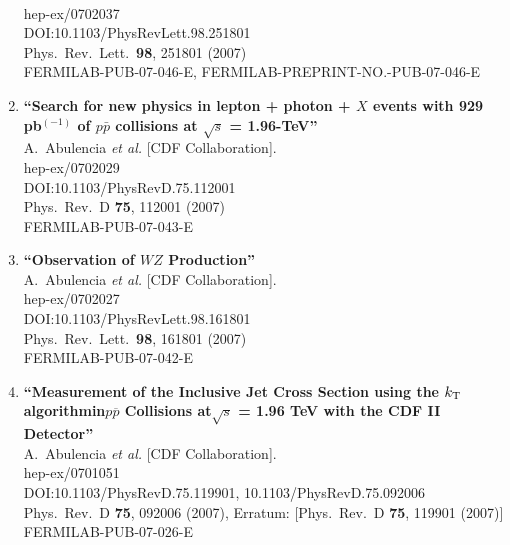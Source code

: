 \documentclass{article}
\begin{document}
\begin{enumerate}
  \\{}hep-ex/0702037
  \\{}DOI:10.1103/PhysRevLett.98.251801
  \\{}Phys.\ Rev.\ Lett.\  {\bf 98}, 251801 (2007)
  \\{}FERMILAB-PUB-07-046-E, FERMILAB-PREPRINT-NO.-PUB-07-046-E
\item%
{\bf ``Search for new physics in lepton + photon + $X$ events with 929 pb$^{(-1)}$ of $p \bar{p}$ collisions at $\sqrt{s}$ = 1.96-TeV''}
  \\{}A.~Abulencia {\it et al.} [CDF Collaboration].
  \\{}hep-ex/0702029
  \\{}DOI:10.1103/PhysRevD.75.112001
  \\{}Phys.\ Rev.\ D {\bf 75}, 112001 (2007)
  \\{}FERMILAB-PUB-07-043-E
\item%
{\bf ``Observation of $WZ$ Production''}
  \\{}A.~Abulencia {\it et al.} [CDF Collaboration].
  \\{}hep-ex/0702027
  \\{}DOI:10.1103/PhysRevLett.98.161801
  \\{}Phys.\ Rev.\ Lett.\  {\bf 98}, 161801 (2007)
  \\{}FERMILAB-PUB-07-042-E
\item%
{\bf ``Measurement of the Inclusive Jet Cross Section using the {\boldmath $k_{\rm T}$} algorithmin{\boldmath $p\overline{p}$} Collisions at{\boldmath $\sqrt{s}$} = 1.96 TeV with the CDF II Detector''}
  \\{}A.~Abulencia {\it et al.} [CDF Collaboration].
  \\{}hep-ex/0701051
  \\{}DOI:10.1103/PhysRevD.75.119901, 10.1103/PhysRevD.75.092006
  \\{}Phys.\ Rev.\ D {\bf 75}, 092006 (2007), Erratum: [Phys.\ Rev.\ D {\bf 75}, 119901 (2007)]
  \\{}FERMILAB-PUB-07-026-E

\end{enumerate}
\end{document}
